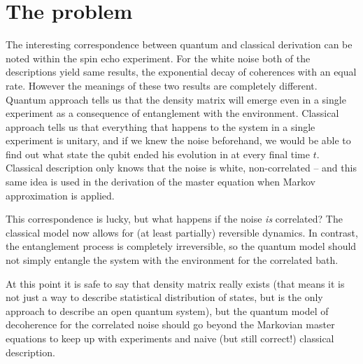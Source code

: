 \documentclass[12pt]{report}
\numberwithin{equation}{section}
\begin{document}
\section{The problem}

The interesting correspondence between quantum and classical derivation can be noted within the spin echo experiment. For the white noise both of the descriptions yield same results, the exponential decay of coherences with an equal rate. However the meanings of these two results are completely different. Quantum approach tells us that the density matrix will emerge even in a single experiment as a consequence of entanglement with the environment. Classical approach tells us that everything that  happens to the system in a single experiment is unitary, and if we knew the noise beforehand, we would be able to find out what state the qubit ended his evolution in at every final time $t$. Classical description only knows that the noise is white, non-correlated -- and this same idea is used in the derivation of the master equation when Markov approximation is applied.

This correspondence is lucky, but what happens if the noise \textit{is} correlated? The classical model now allows for (at least partially) reversible dynamics. In contrast, the entanglement process is completely irreversible, so the quantum model should not simply entangle the system with the environment for the correlated bath.

At this point it is safe to say that density matrix really exists (that means it is not just a way to describe statistical distribution of states, but is the only approach to describe an open quantum system), but the quantum model of decoherence for the correlated noise should go beyond the Markovian master equations to keep up with experiments and naive (but still correct!) classical description.\cite{Zurek2003}
\end{document}
